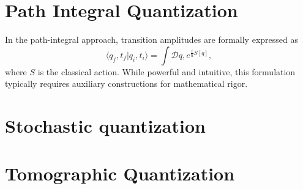 \section{Path Integral Quantization}

In the path-integral approach, transition amplitudes are formally expressed as
\begin{equation}
\langle q_f,t_f | q_i,t_i \rangle = \int \mathcal{D}q, e^{\frac{i}{\hbar}S[q]},
\end{equation}
where $S$ is the classical action. While powerful and intuitive, this formulation typically requires auxiliary constructions for mathematical rigor.

\section{Stochastic quantization}
\label{stochastic-quantization}

\section{Tomographic Quantization}
\label{tomographic-quantization}

